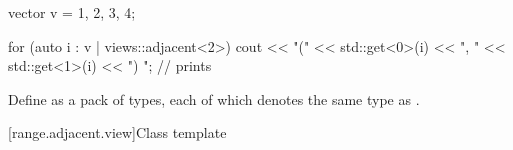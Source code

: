 \begin{example}
\begin{codeblock}
vector v = {1, 2, 3, 4};

for (auto i : v | views::adjacent<2>) {
  cout << "(" << std::get<0>(i) << ", " << std::get<1>(i) << ") ";  // prints 
}
\end{codeblock}
\end{example}

\pnum
Define  as a pack of  types,
each of which denotes the same type as .

[range.adjacent.view]{Class template }

%
%
%
